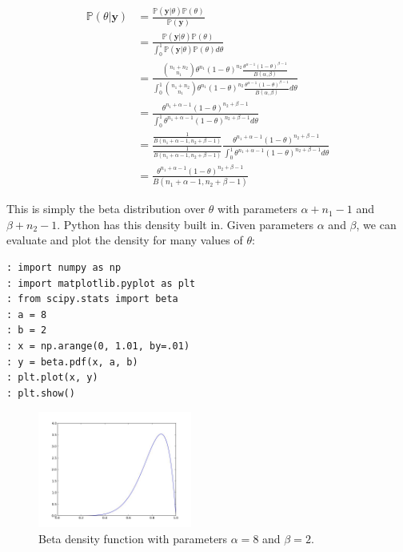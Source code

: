 \begin{align*}
\mathbb{P}(\theta | \mathbf{y}) & = \frac{\mathbb{P}(\mathbf{y} | \theta)\mathbb{P}(\theta)}{\mathbb{P}(\mathbf{y})} \\
& = \frac{\mathbb{P}(\mathbf{y} | \theta)\mathbb{P}(\theta)}{\int_{0}^{1} \mathbb{P}(\mathbf{y} | \theta)\mathbb{P}(\theta) d\theta} \\
& = \frac{{n_{1} + n_{2} \choose n_{1}} \theta^{n_{1}}(1-\theta)^{n_{2}} \frac{\theta^{\alpha - 1}(1 - \theta)^{\beta - 1}}{B(\alpha,\beta)}}{\int_{0}^{1} {n_{1} + n_{2} \choose n_{1}} \theta^{n_{1}}(1-\theta)^{n_{2}} \frac{\theta^{\alpha - 1}(1 - \theta)^{\beta - 1}}{B(\alpha,\beta)} d\theta} \\
& = \frac{ \theta^{n_{1} + \alpha - 1}(1-\theta)^{n_{2} + \beta - 1}}{\int_{0}^{1} \theta^{n_{1} + \alpha - 1}(1-\theta)^{n_{2} + \beta - 1} d\theta} \\
& = \frac{\frac{1}{B(n_{1} + \alpha - 1, n_{2} + \beta - 1)}}{\frac{1}{B(n_{1} + \alpha - 1, n_{2} + \beta - 1)}} \frac{ \theta^{n_{1} + \alpha - 1}(1-\theta)^{n_{2} + \beta - 1}}{\int_{0}^{1} \theta^{n_{1} + \alpha - 1}(1-\theta)^{n_{2} + \beta - 1} d\theta} \\
& = \frac{ \theta^{n_{1} + \alpha - 1}(1-\theta)^{n_{2} + \beta - 1}}{B(n_{1} + \alpha - 1, n_{2} + \beta - 1)}
\end{align*}

This is simply the beta distribution over $\theta$ with parameters $\alpha + n_{1} - 1$ and $\beta + n_{2} - 1$. Python has this density built in. Given parameters $\alpha$ and $\beta$, we can evaluate and plot the density for many values of $\theta$:

\begin{lstlisting}
: import numpy as np
: import matplotlib.pyplot as plt
: from scipy.stats import beta
: a = 8
: b = 2
: x = np.arange(0, 1.01, by=.01)
: y = beta.pdf(x, a, b)
: plt.plot(x, y)
: plt.show()
\end{lstlisting}

\begin{figure}[h]
\begin{center}
\includegraphics[height=1.5in]{beta.jpeg}
\end{center}
\caption{Beta density function with parameters $\alpha = 8$ and $\beta = 2$.}
\end{figure}

